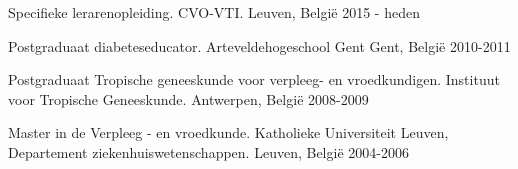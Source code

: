 


\begin{cventries}



\cventry
{Specifieke lerarenopleiding.} %
{CVO-VTI.} %
{Leuven, België} %
{2015 - heden} %
{ %
}

\cventry
{Postgraduaat diabeteseducator.} %
{Arteveldehogeschool Gent} %
{Gent, België} %
{2010-2011} %
{ %
}

\cventry
{Postgraduaat Tropische geneeskunde voor verpleeg- en vroedkundigen.} %
{Instituut voor Tropische Geneeskunde.} %
{Antwerpen, België} %
{2008-2009} %
{ %
}



\cventry
{Master in de Verpleeg - en vroedkunde.} %
{Katholieke Universiteit Leuven, Departement ziekenhuiswetenschappen.} %
{Leuven, België} %
{2004-2006} %
{ %
}


\end{cventries}
